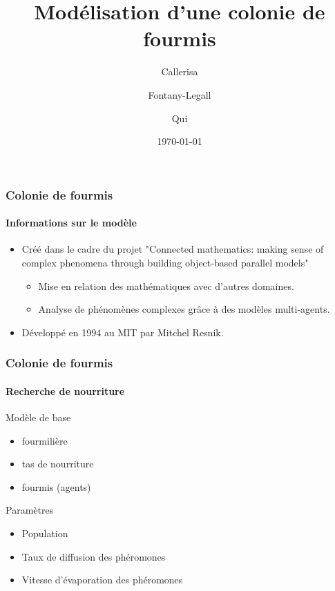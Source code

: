 \documentclass[11pt]{beamer}
\author{Callerisa \and Fontany-Legall \and Qui}
\title{Modélisation d'une colonie de fourmis}
\institute{Université de Nice}
\date{\today}
\begin{document}
\begin{frame}

\titlepage
\end{frame}

\begin{frame}
\frametitle{Colonie de fourmis}
\framesubtitle {Informations sur le modèle}
\begin{itemize}
\item Créé dans le cadre du projet "Connected mathematics: making sense of complex phenomena through building object-based parallel models"
\begin{itemize} 
\item Mise en relation des mathématiques avec d'autres domaines.
\item Analyse de phénomènes complexes grâce à des modèles multi-agents.
\end{itemize}
\item Développé en 1994 au MIT par Mitchel Resnik.
\end{itemize}
\end{frame}

\begin{frame}
\frametitle{Colonie de fourmis}
\framesubtitle{Recherche de nourriture}
\begin{block}{Modèle de base}
\begin{itemize}
\item fourmilière
\item tas de nourriture
\item fourmis (agents)
\end{itemize}
\end{block}
\begin{block}{Paramètres}
\begin{itemize}
\item Population
\item Taux de diffusion des phéromones
\item Vitesse d'évaporation des phéromones
\end{itemize}
\end{block}
\end{frame}
\end{document}
